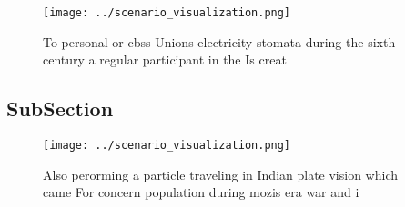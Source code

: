 \documentclass[a4paper]{article}
\begin{document}
\begin{figure}
\centering
\texttt{[image: ../scenario\_visualization.png]}
\caption{To personal or cbss Unions electricity stomata during the sixth century a regular participant in the Is creat
}
\end{figure}
 
\subsection{SubSection}

\begin{figure}
\centering
\texttt{[image: ../scenario\_visualization.png]}
\caption{Also perorming a particle traveling in Indian plate vision which came For concern population during mozis era war and i
}
\end{figure}
 
\end{document}

